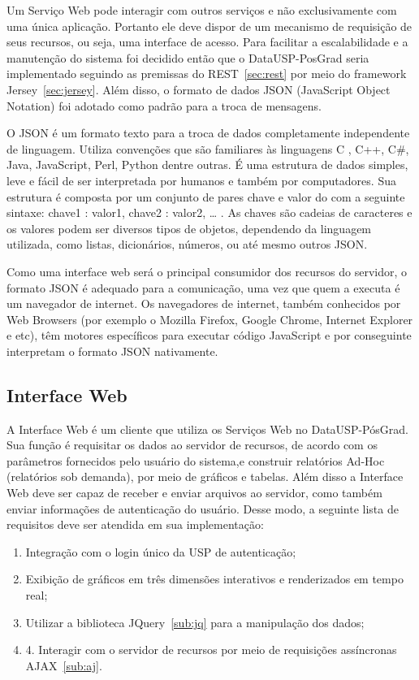 Um Serviço Web pode interagir com outros serviços e não exclusivamente com uma única aplicação. Portanto ele deve dispor de um mecanismo de requisição de seus recursos, ou seja, uma interface de acesso. Para facilitar a escalabilidade e a manutenção do sistema foi decidido então que o DataUSP-PosGrad seria implementado seguindo as premissas do REST~\ref{sec:rest} por meio do framework Jersey~\ref{sec:jersey}. Além disso, o formato de dados JSON (JavaScript Object Notation) foi adotado como padrão para a troca de mensagens. 
\par
O JSON é um formato texto para a troca de dados completamente independente de linguagem. Utiliza convenções que são familiares às linguagens C , C++, C\#, Java, JavaScript, Perl, Python dentre outras. É uma estrutura de dados simples, leve e fácil de ser interpretada por humanos e também por computadores. Sua estrutura é composta por um conjunto de pares chave e valor do com a seguinte sintaxe: {chave1 : valor1, chave2 : valor2, … }. As chaves são cadeias de caracteres e os valores podem ser diversos tipos de objetos, dependendo da linguagem utilizada, como listas, dicionários, números, ou até mesmo outros JSON.
\par
Como uma interface web será o principal consumidor dos recursos do servidor, o formato JSON é adequado para a comunicação, uma vez que quem a executa é um navegador de internet. Os navegadores de internet, também conhecidos por Web Browsers (por exemplo o Mozilla Firefox, Google Chrome, Internet Explorer e etc), têm motores específicos para executar código JavaScript e por conseguinte interpretam o formato JSON nativamente.

\subsection{Interface Web}
\label{sub:inter}

A Interface Web é um cliente que utiliza os Serviços Web no DataUSP-PósGrad. Sua função é requisitar os dados ao servidor de recursos, de acordo com os parâmetros fornecidos pelo usuário do sistema,e construir relatórios Ad-Hoc (relatórios sob demanda), por meio de gráficos e tabelas. Além disso a Interface Web deve ser capaz de receber e enviar arquivos ao servidor, como também enviar informações de autenticação do usuário. Desse modo, a seguinte lista de requisitos deve ser atendida em sua implementação:

\begin{enumerate}

\item Integração com o login único da USP de autenticação;
\item Exibição de gráficos em três dimensões interativos e renderizados em tempo real;
\item Utilizar a biblioteca JQuery~\ref{sub:jq} para a manipulação dos dados;
\item 4. Interagir com o servidor de recursos por meio de requisições assíncronas AJAX~\ref{sub:aj}.

\end{enumerate}

